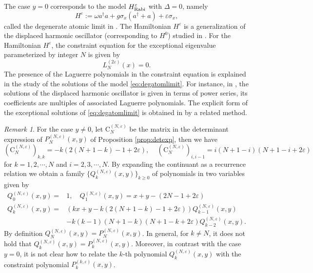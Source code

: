 \documentclass[11pt]{article}
\numberwithin{equation}{section}
\newcommand{\e}{\varepsilon}
\newcommand{\HRabi}[1]{H_{\text{\upshape Rabi}}^{#1}} %
\newcommand{\cp}[2]{P^{(#1)}_{#2}} %
\newcommand{\MatSymbol}[1]{\bm{\mathrm{#1}}}
\newcommand{\mC}{\MatSymbol{C}}
\theoremstyle{plain}
\theoremstyle{definition}
\theoremstyle{remark}
\newtheorem{rem}{Remark}[section]
\begin{document}
The case \(y =0\) corresponds to the model \(\HRabi{\e}\) with \(\Delta= 0\), namely
\begin{equation} \label{eq:degatomlimit}
  H^\e := \omega a^\dag a +g\sigma_x(a^\dag+a) + \e \sigma_x,
\end{equation}
called the degenerate atomic limit in \cite{LB2015JPA}. The Hamiltonian \(H^\e\) is a generalization of the displaced harmonic oscillator
(corresponding to \(H^0\)) studied in \cite{Sc1967AP}. For the Hamiltonian \(H^\e\), the constraint equation for the exceptional eigenvalue
parameterized by integer \(N\) is given by
\[
  L^{(2\e)}_N (x) = 0.
\]
The presence of the Laguerre polynomials in the constraint equation is explained in the study of the solutions of the model \eqref{eq:degatomlimit}.
For instance, in \cite{Sc1967AP}, the solutions of the displaced harmonic oscillator is given in terms of power series, its coefficients are
multiples of associated Laguerre polynomials. The explicit form of the exceptional solutions of \eqref{eq:degatomlimit} is obtained in
\cite{LB2015JPA} by a related method.

\begin{rem}
  For the case \(y \not= 0 \), let \(\mC_N^{(N,\e)}\) be the matrix in the determinant expression of \(\cp{N,\e}{N}(x,y)\) of Proposition
  \ref{prop:detexp}, then we have
  \[
    (\mC_N^{(N,\e)})_{k,k} = -k(2(N+1-k) -1 + 2\e), \quad \, (\mC_N^{(N,\e)})_{i,i-1} = i (N+1-i)(N+1-i+2\e)
  \]
  for \(k =1,2,\cdots,N\) and \(i =2,3,\cdots,N\). By expanding the continuant as a recurrence relation we obtain a family
  \(\{Q^{(N,\e)}_k(x,y)\}_{k\geq 0}\) of polynomials in two variables  given by
  \begin{align*}
    Q^{(N,\e)}_0(x,y) =& 1, \quad Q^{(N,\e)}_1(x,y) = x+y -  (2 N -1  + 2\e)  \\
    Q^{(N,\e)}_k(x,y) =& (k x + y  - k (2(N+1-k) -1 + 2\e)) Q^{(N,\e)}_{k-1}(x,y) \\
                      & - k (k-1)(N+1-k)(N+1-k+2\e) Q^{(N,\e)}_{k-2}(x,y).
  \end{align*}
  By definition  $Q^{(N,\e)}_N(x,y) = \cp{N,\e}{N}(x,y) $. In general, for \(k \neq N\), it does not hold that
  $Q^{(N,\e)}_k(x,y) = \cp{N,\e}{k}(x,y)$. Moreover, in contrast with the case \(y=0 \),
  it is not clear how to relate the $k$-th polynomial $Q^{(N,\e)}_k(x,y)$ with the constraint polynomial $\cp{k,\e}{k}(x,y)$.
\end{rem}
\,

\end{document}
